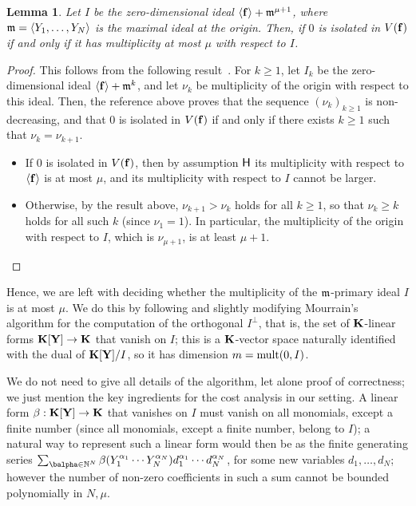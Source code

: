 \documentclass[12pt]{article}
\newtheorem{lemma}[definition]{Lemma}
\begin{document}
\begin{lemma}
  Let $I$ be the zero-dimensional ideal $\langle \mathbf{f} \rangle +
  \mathfrak{m}^{\mu+1}$, where $\mathfrak{m}=\langle Y_1,\dots,Y_N\rangle$ is the maximal
  ideal at the origin. Then, if $0$ is isolated in $V(\mathbf{f})$ if and only
  if it has multiplicity at most $\mu$ with respect to $I$.
\end{lemma}
\begin{proof}
  This follows from the following
  result~\cite[Theorem~A.1]{BaHaPeSo09}.  For $k \ge 1$, let $I_k$ be
  the zero-dimensional ideal $\langle \mathbf{f} \rangle + \mathfrak{m}^{k}$, and let
  $\nu_k$ be multiplicity of the origin with respect to this
  ideal. Then, the reference above proves that the sequence
  $(\nu_k)_{k \ge 1}$ is non-decreasing, and that $0$ is isolated in
  $V(\mathbf{f})$ if and only if there exists $k\ge 1$ such that
  $\nu_k=\nu_{k+1}$.
  \begin{itemize}
  \item If $0$ is isolated in $V(\mathbf{f})$, then by assumption $\mathsf{H}$ 
    its multiplicity with respect to $\langle \mathbf{f}\rangle$ is at most $\mu$,
    and its multiplicity with respect to $I$ cannot be larger.
  \item Otherwise, by the result above, $\nu_{k+1} > \nu_k$ holds for
    all $k \ge 1$, so that $\nu_k \ge k$ holds for all such $k$ (since
    $\nu_1=1$). In particular, the multiplicity of the origin with
    respect to $I$, which is $\nu_{\mu+1}$, is at least $\mu+1$.
    \qedhere
  \end{itemize}
\end{proof}

Hence, we are left with deciding whether the multiplicity of the
$\mathfrak{m}$-primary ideal $I$ is at most $\mu$. We do this by following and
slightly modifying Mourrain's algorithm for the computation of the
orthogonal $I^{\perp}$, that is, the set of $\mathbf{K}$-linear forms
$\mathbf{K}[\mathbf{Y}] \to \mathbf{K}$ that vanish on $I$; this is a $\mathbf{K}$-vector space
naturally identified with the dual of $\mathbf{K}[\mathbf{Y}]/I$, so it has dimension
$m=\mathrm{mult}(0,I)$.

We do not need to give all details of the algorithm, let alone proof
of correctness; we just mention the key ingredients for the cost
analysis in our setting. A linear form $\beta: \mathbf{K}[\mathbf{Y}] \to \mathbf{K}$ that
vanishes on $I$ must vanish on all monomials, except a finite number
(since all monomials, except a finite number, belong to $I$); a
natural way to represent such a linear form would then be as the
finite generating series $\sum_{\balpha \in \N^N}
\beta(Y_1^{\alpha_1}\cdots Y_N^{\alpha_N}) d_1^{\alpha_1}\cdots
d_N^{\alpha_N}$, for some new variables $d_1,\dots,d_N$; however the
number of non-zero coefficients in such a sum cannot be bounded
polynomially in $N,\mu$.
\end{document}
